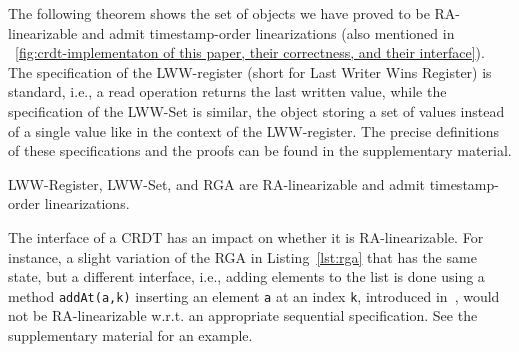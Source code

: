 The following theorem shows the set of objects we have proved to be RA-linearizable and admit timestamp-order linearizations (also mentioned in \figureautorefname~\ref{fig:crdt-implementaton of this paper, their correctness, and their interface}). The specification of the LWW-register (short for Last Writer Wins Register) is standard, i.e., a read operation returns the last written value, while the specification of the LWW-Set is similar, the object storing a set of values instead of a single value like in the context of the LWW-register. The precise definitions of these specifications and the proofs can be found in the supplementary material.

\begin{theorem}\label{th:ts_order_objects}
LWW-Register, LWW-Set, and RGA are RA-linearizable and admit timestamp-order linearizations.
\end{theorem}

The interface of a CRDT has an impact on whether it is RA-linearizable. For instance, a slight variation of the RGA in Listing~\ref{lst:rga} that has the same state, but a different interface, i.e., adding elements to the list is done using a method \lstinline|addAt(a,k)| inserting an element \lstinline|a| at an index \lstinline|k|, introduced in~\cite{AttiyaBGMYZ16}, would not be RA-linearizable w.r.t. an appropriate sequential specification. See the supplementary material for an example. 

